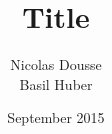 \documentclass[a4paper, twocolumn]{article}
\begin{document}
\title{Title}
\author{Nicolas Dousse\\Basil Huber }
\date{September 2015}


\twocolumn[
	\maketitle
	\begin{abstract}
	
	\vspace{1cm}			%
	\end{abstract}]
 
 










\end{document}
